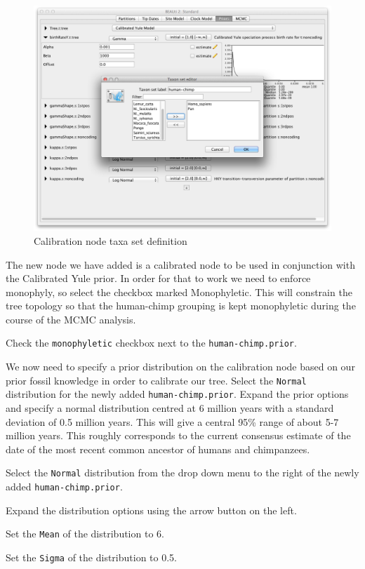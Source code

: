 \documentclass[11pt]{article}
\begin{document}
\begin{figure}[H]
\centering
\includegraphics[width=5in]{figures/taxa.png}
\caption{\small Calibration node taxa set definition}
\label{fig:taxa}
\end{figure}

The new node we have added is a calibrated node to be used in conjunction with the Calibrated Yule prior. In order for that to work we need to enforce monophyly, so select the checkbox marked Monophyletic. This will constrain the tree topology so that the human-chimp grouping is kept monophyletic during the course of the MCMC analysis.

\begin{framed}
Check the \texttt{monophyletic} checkbox next to the \texttt{human-chimp.prior}.
\end{framed}

We now need to specify a prior distribution on the calibration node based on our prior fossil knowledge in order to calibrate our tree. Select the \texttt{Normal} distribution for the newly added \texttt{human-chimp.prior}. Expand the prior options and  specify a normal distribution centred at 6 million years with a standard deviation of 0.5 million years. This will give a central 95\% range of about 5-7 million years. This roughly corresponds to the current consensus estimate of the date of the most recent common ancestor of humans and chimpanzees.

\begin{framed}
Select the \texttt{Normal} distribution from the drop down menu to the right of the newly added \texttt{human-chimp.prior}.

Expand the distribution options using the arrow button on the left.

Set the \texttt{Mean} of the distribution to 6.

Set the \texttt{Sigma} of the distribution to 0.5.
\end{framed}
\end{document}
